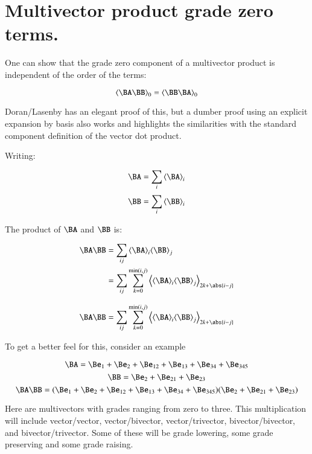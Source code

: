 
\chapter{Multivector product grade zero terms.}

One can show that the grade zero component of a multivector product 
is independent of the order of the terms:

\begin{equation}
\gpgradezero{\BA \BB} = \gpgradezero{\BB \BA}
\end{equation}

Doran/Lasenby has an elegant proof of this, but a dumber proof using an
explicit expansion by basis also works and highlights the similarities
with the standard component definition of the vector dot product.

Writing:

\[
\BA = \sum_i \gpgrade{\BA}{i}
\]
\[
\BB = \sum_i \gpgrade{\BB}{i}
\]

The product of $\BA$ and $\BB$ is:

\begin{align*}
\BA \BB 
&= \sum_{ij} \gpgrade{\BA}{i} \gpgrade{\BB}{j} \\
&= \sum_{ij} \sum_{k=0}^{\min(i,j)}\gpgrade{\gpgrade{\BA}{i} \gpgrade{\BB}{j}}{2k + \abs{i-j}} \\
\end{align*}

\begin{equation}\label{eqn:scalar_commutes:product}
\BA \BB 
= \sum_{ij} \sum_{k=0}^{\min(i,j)}\gpgrade{\gpgrade{\BA}{i} \gpgrade{\BB}{j}}{2k + \abs{i-j}} 
\end{equation}

To get a better feel for this, consider an example

\[
\BA = \Be_1 + \Be_2 + \Be_{12} + \Be_{13} + \Be_{34} + \Be_{345}
\]
\[
\BB = \Be_2 + \Be_{21} + \Be_{23}
\]
\[
\BA \BB = ( \Be_1 + \Be_2 + \Be_{12} + \Be_{13} + \Be_{34} + \Be_{345})(\Be_2 + \Be_{21} + \Be_{23})
\]

Here are multivectors with grades ranging from zero to three.  This multiplication will include vector/vector, vector/bivector, vector/trivector, bivector/bivector, and bivector/trivector.  Some of these will be grade lowering, some grade preserving and some grade raising.

